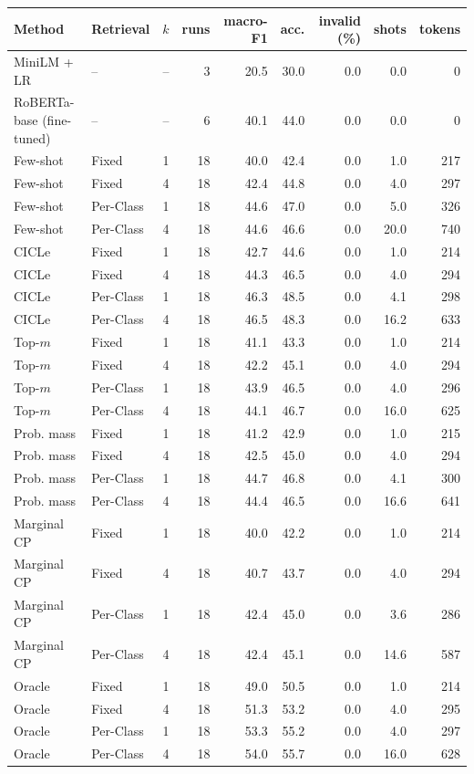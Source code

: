 \begin{tabular}{llrrrrrrr}
\toprule
Method & Retrieval & $k$ & runs & macro-F1 & acc. & invalid (\%) & shots & tokens \\
\midrule
MiniLM + LR & -- & -- & 3 & 20.5 & 30.0 & 0.0 & 0.0 & 0 \\
RoBERTa-base (fine-tuned) & -- & -- & 6 & 40.1 & 44.0 & 0.0 & 0.0 & 0 \\
\midrule
Few-shot & Fixed & 1 & 18 & 40.0 & 42.4 & 0.0 & 1.0 & 217 \\
Few-shot & Fixed & 4 & 18 & 42.4 & 44.8 & 0.0 & 4.0 & 297 \\
Few-shot & Per-Class & 1 & 18 & 44.6 & 47.0 & 0.0 & 5.0 & 326 \\
Few-shot & Per-Class & 4 & 18 & 44.6 & 46.6 & 0.0 & 20.0 & 740 \\
CICLe & Fixed & 1 & 18 & 42.7 & 44.6 & 0.0 & 1.0 & 214 \\
CICLe & Fixed & 4 & 18 & 44.3 & 46.5 & 0.0 & 4.0 & 294 \\
CICLe & Per-Class & 1 & 18 & 46.3 & 48.5 & 0.0 & 4.1 & 298 \\
CICLe & Per-Class & 4 & 18 & 46.5 & 48.3 & 0.0 & 16.2 & 633 \\
\midrule
Top-$m$ & Fixed & 1 & 18 & 41.1 & 43.3 & 0.0 & 1.0 & 214 \\
Top-$m$ & Fixed & 4 & 18 & 42.2 & 45.1 & 0.0 & 4.0 & 294 \\
Top-$m$ & Per-Class & 1 & 18 & 43.9 & 46.5 & 0.0 & 4.0 & 296 \\
Top-$m$ & Per-Class & 4 & 18 & 44.1 & 46.7 & 0.0 & 16.0 & 625 \\
Prob. mass & Fixed & 1 & 18 & 41.2 & 42.9 & 0.0 & 1.0 & 215 \\
Prob. mass & Fixed & 4 & 18 & 42.5 & 45.0 & 0.0 & 4.0 & 294 \\
Prob. mass & Per-Class & 1 & 18 & 44.7 & 46.8 & 0.0 & 4.1 & 300 \\
Prob. mass & Per-Class & 4 & 18 & 44.4 & 46.5 & 0.0 & 16.6 & 641 \\
Marginal CP & Fixed & 1 & 18 & 40.0 & 42.2 & 0.0 & 1.0 & 214 \\
Marginal CP & Fixed & 4 & 18 & 40.7 & 43.7 & 0.0 & 4.0 & 294 \\
Marginal CP & Per-Class & 1 & 18 & 42.4 & 45.0 & 0.0 & 3.6 & 286 \\
Marginal CP & Per-Class & 4 & 18 & 42.4 & 45.1 & 0.0 & 14.6 & 587 \\
Oracle & Fixed & 1 & 18 & 49.0 & 50.5 & 0.0 & 1.0 & 214 \\
Oracle & Fixed & 4 & 18 & 51.3 & 53.2 & 0.0 & 4.0 & 295 \\
Oracle & Per-Class & 1 & 18 & 53.3 & 55.2 & 0.0 & 4.0 & 297 \\
Oracle & Per-Class & 4 & 18 & 54.0 & 55.7 & 0.0 & 16.0 & 628 \\
\bottomrule
\end{tabular}
